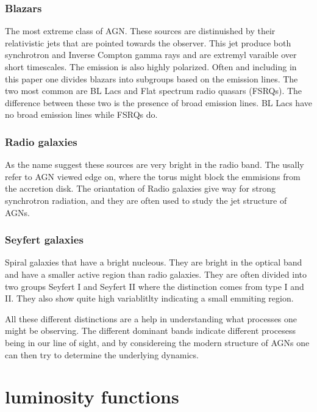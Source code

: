 \documentclass{article}
\begin{document}
\subsubsection{Blazars}
The most extreme class of AGN. These sources are distinuished by their relativistic jets that are pointed towards the observer. 
This jet produce both synchrotron and Inverse Compton gamma rays and are extremyl varaible over short timescales. The
emission is also highly polarized. Often and including in this paper one divides blazars into subgroups based on the 
emission lines. The two most common are BL Lacs and Flat spectrum radio quasars (FSRQs). The difference between these two is the
presence of broad emission lines. BL Lacs have no broad emission lines while FSRQs do.

\subsubsection{Radio galaxies}
As the name suggest these sources are very bright in the radio band. The usally refer to AGN viewed edge on, where the
torus might block the emmisions from the accretion disk. The oriantation of Radio galaxies give way for strong 
synchrotron radiation, and they are often used to study the jet structure of AGNs.

\subsubsection{Seyfert galaxies}
Spiral galaxies that have a bright nucleous. They are bright in the optical band and have a smaller active region 
than radio galaxies. They are often divided into two groups Seyfert I and Seyfert II where the distinction comes from type I and II. 
They also show quite high variablitlty indicating a small emmiting region. 



All these different distinctions are a help in understanding what processes one might be observing. The different
dominant bands indicate different procesess being in our line of sight, and by considereing the modern structure of 
AGNs one can then try to determine the underlying dynamics.  


\section{ luminosity functions}
\end{document}
